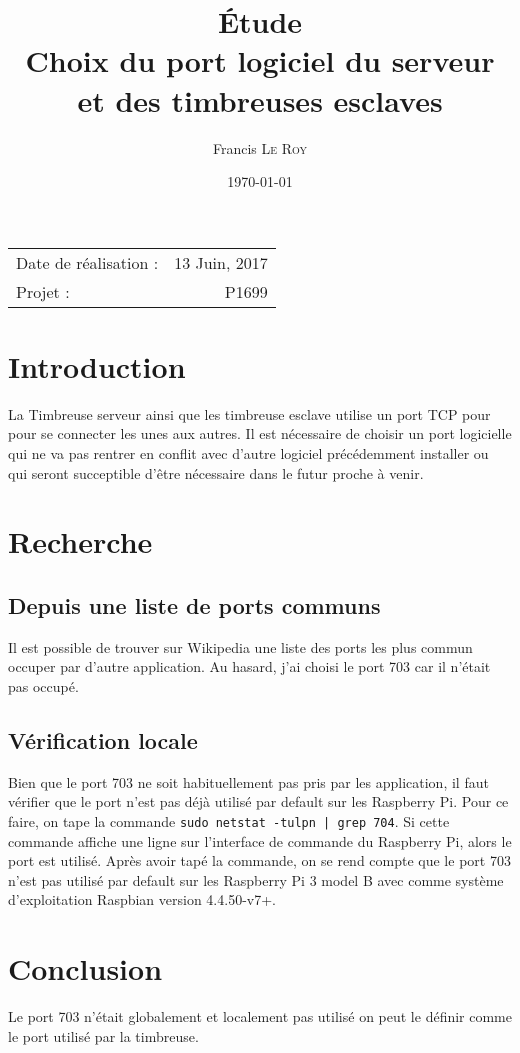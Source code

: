 \documentclass[10pt,a4paper,onecolumn]{article}
\title{Étude \\ Choix du port logiciel du serveur \\ et des timbreuses esclaves}
\author{Francis \textsc{Le Roy}}
\date{\today}
\begin{document}
\maketitle
\thispagestyle{fancy}

\begin{center}
\begin{tabular}{l r}
Date de réalisation : & 13 Juin, 2017 \\
Projet : & P1699 \\
\end{tabular}
\end{center}


\section{Introduction}
La Timbreuse serveur ainsi que les timbreuse esclave utilise un port TCP pour pour se connecter les unes aux autres. Il est nécessaire de choisir un port logicielle qui ne va pas rentrer en conflit avec d'autre logiciel précédemment installer ou qui seront succeptible d'être nécessaire dans le futur proche à venir.
\section{Recherche}
\subsection{Depuis une liste de ports communs}
Il est possible de trouver sur Wikipedia\cite{Wikipedia} une liste des ports les plus commun occuper par d'autre application. Au hasard, j'ai choisi le port 703 car il n'était pas occupé.
\subsection{Vérification locale}
Bien que le port 703 ne soit habituellement pas pris par les application, il faut vérifier que le port n'est pas déjà utilisé par default sur les Raspberry Pi. Pour ce faire, on tape la commande \texttt{sudo netstat -tulpn | grep 704}. Si cette commande affiche une ligne sur l'interface de commande du Raspberry Pi, alors le port est utilisé. Après avoir tapé la commande, on se rend compte que le port 703 n'est pas utilisé par default sur les Raspberry Pi 3 model B avec comme système d'exploitation Raspbian version 4.4.50-v7+.

\section{Conclusion}
Le port 703 n'était globalement et localement pas utilisé on peut le définir comme le port utilisé par la timbreuse.

\printbibliography
\end{document}
